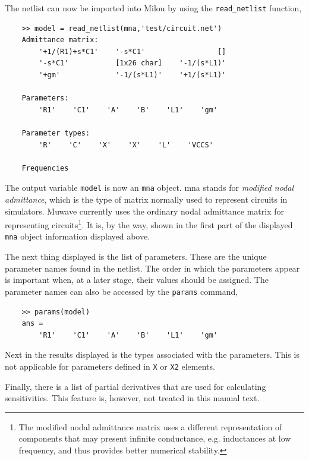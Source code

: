 The netlist can now be imported into Milou by using the
\verb"read_netlist" function,
\begin{small}
\begin{verbatim}
    >> model = read_netlist(mna,'test/circuit.net')
    Admittance matrix:
        '+1/(R1)+s*C1'    '-s*C1'                 []
        '-s*C1'           [1x26 char]    '-1/(s*L1)'
        '+gm'             '-1/(s*L1)'    '+1/(s*L1)'

    Parameters:
        'R1'    'C1'    'A'    'B'    'L1'    'gm'

    Parameter types:
        'R'    'C'    'X'    'X'    'L'    'VCCS'

    Frequencies
\end{verbatim}
\end{small}

The output variable \verb"model" is now an \verb"mna" object. mna
stands for \emph{modified nodal admittance}, which is the type of
matrix normally used to represent circuits in simulators. Muwave
currently uses the ordinary nodal admittance matrix for
representing circuits\footnote{The modified nodal admittance
matrix uses a different representation of components that may
present infinite conductance, e.g. inductances at low frequency,
and thus provides better numerical stability.}. It is, by the way,
shown in the first part of the displayed \verb"mna" object
information displayed above.

The next thing displayed is the list of parameters. These are the
unique parameter names found in the netlist. The order in which
the parameters appear is important when, at a later stage, their
values should be assigned. The parameter names can also be
accessed by the \verb"params" command,
\begin{small}
\begin{verbatim}
    >> params(model)
    ans =
        'R1'    'C1'    'A'    'B'    'L1'    'gm'
\end{verbatim}
\end{small}

Next in the results displayed is the types associated with the parameters.
This is not applicable for parameters defined in \verb"X" or
\verb"X2" elements.

Finally, there is a list of partial derivatives that are used for
calculating sensitivities. This feature is, however, not treated
in this manual text.

